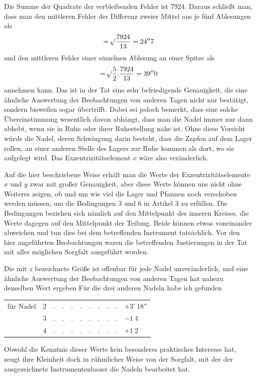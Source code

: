 Die Summe der Quadrate der verbleibenden Fehler ist $7924$. Daraus schließt man, dass man den mittleren Fehler der Differenz zweier Mittel aus je fünf Ablesungen als
\[
=\mathord{{}^{}\!\surd}\frac{7924}{13}=24''7
\]
und den mittleren Fehler einer einzelnen Ablesung an einer Spitze als
\[
=\mathord{{}^{}\!\surd}\frac{5}{2}.\frac{7924}{13}=39''0
\]
annehmen kann. Das ist in der Tat eine sehr befriedigende Genauigkeit, die eine ähnliche Auswertung der Beobachtungen von anderen Tagen nicht nur bestätigt, sondern bisweilen sogar übertrifft. Dabei sei jedoch bemerkt, dass eine solche Übereinstimmung wesentlich davon abhängt, dass man die Nadel immer nur dann abhebt, wenn sie in Ruhe oder ihrer Ruhestellung nahe ist. Ohne diese Vorsicht würde die Nadel, deren Schwingung darin besteht, dass die Zapfen auf dem Lager rollen, an einer anderen Stelle des Lagers zur Ruhe kommen als dort, wo sie aufgelegt wird. Das Exzentrizitätselement $x$ wäre also veränderlich.

Auf die hier beschriebene Weise erhält man die Werte der Exzentrizitätselemente $x$ und $y$ zwar mit großer Genauigkeit, aber diese Werte
können uns nicht ohne Weiteres zeigen, ob und um wie viel die Lager und Pfannen noch verschoben werden müssen, um die Bedingungen 3 und 6 in Artikel 3 zu erfüllen. Die Bedingungen beziehen sich nämlich auf den Mittelpunkt des inneren Kreises, die Werte dagegen auf den Mittelpunkt der Teilung. Beide können etwas voneinander abweichen und tun dies bei dem betreffenden Instrument tatsächlich. Vor den hier angeführten Beobachtungen waren die betreffenden Justierungen in der Tat mit aller möglichen Sorgfalt ausgeführt worden.

Die mit $z$ bezeichnete Größe ist offenbar für jede Nadel unveränderlich, und eine ähnliche Auswertung der Beobachtungen von anderen Tagen hat nahezu denselben Wert ergeben Für die drei anderen Nadeln habe ich gefunden
\begin{center}
\begin{tabular}{crll}
für Nadel&$2$&$.\quad.\quad.\quad.\quad.\quad.\quad.\quad.$&$+3'\ 18''$\\
&$3$&$.\quad.\quad.\quad.\quad.\quad.\quad.\quad.$&$-1\ 4$\\
&$4$&$.\quad.\quad.\quad.\quad.\quad.\quad.\quad.$&$+1\ 2$
\end{tabular}
\end{center}

Obwohl die Kenntnis dieser Werte kein besonderes praktisches Interesse hat, zeugt ihre Kleinheit doch in rühmlicher Weise von der Sorgfalt, mit der der ausgezeichnete Instrumentenbauer die Nadeln bearbeitet hat.

